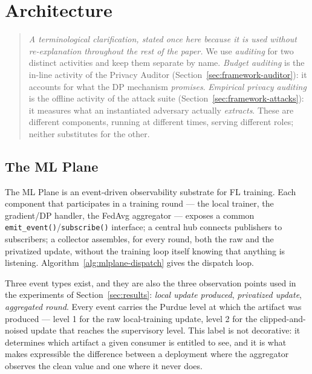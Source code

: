 
\section{Architecture}
\label{sec:framework}

\begin{quote}
\emph{A terminological clarification, stated once here because it is
used without re-explanation throughout the rest of the paper.} We use
\emph{auditing} for two distinct activities and keep them separate by
name. \emph{Budget auditing} is the in-line activity of the Privacy
Auditor (Section~\ref{sec:framework-auditor}): it accounts for what the
DP mechanism \emph{promises}. \emph{Empirical privacy auditing} is the
offline activity of the attack suite (Section~\ref{sec:framework-attacks}):
it measures what an instantiated adversary actually \emph{extracts}.
These are different components, running at different times, serving
different roles; neither substitutes for the other.
\end{quote}

\subsection{The ML Plane}
\label{sec:framework-mlplane}

The ML Plane is an event-driven observability substrate for FL
training. Each component that participates in a training round --- the
local trainer, the gradient/DP handler, the FedAvg aggregator ---
exposes a common \texttt{emit\_event()}/\texttt{subscribe()} interface;
a central hub connects publishers to subscribers; a collector
assembles, for every round, both the raw and the privatized update,
without the training loop itself knowing that anything is listening.
Algorithm~\ref{alg:mlplane-dispatch} gives the dispatch loop.

Three event types exist, and they are also the three observation
points used in the experiments of Section~\ref{sec:results}: \emph{local
update produced}, \emph{privatized update}, \emph{aggregated round}.
Every event carries the Purdue level at which the artifact was
produced --- level 1 for the raw local-training update, level 2 for
the clipped-and-noised update that reaches the supervisory level. This
label is not decorative: it determines which artifact a given consumer
is entitled to see, and it is what makes expressible the difference
between a deployment where the aggregator observes the clean value and
one where it never does.

